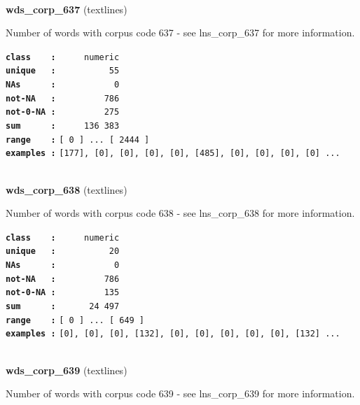 \documentclass[]{article}
\begin{document}
~

\textbf{wds\_corp\_637} (textlines)

Number of words with corpus code 637 - see lns\_corp\_637 for more
information.

\textbf{\texttt{class\ \ \ \ :}} \texttt{~~~~~numeric}\\
\textbf{\texttt{unique\ \ \ :}} \texttt{~~~~~~~~~~55}\\
\textbf{\texttt{NAs\ \ \ \ \ \ :}} \texttt{~~~~~~~~~~~0}\\
\textbf{\texttt{not-NA\ \ \ :}} \texttt{~~~~~~~~~786}\\
\textbf{\texttt{not-0-NA\ :}} \texttt{~~~~~~~~~275}\\
\textbf{\texttt{sum\ \ \ \ \ \ :}} \texttt{~~~~~136~383}\\
\textbf{\texttt{range\ \ \ \ :}}
\texttt{{[}\ 0\ {]}\ ...\ {[}\ 2444\ {]}}\\
\textbf{\texttt{examples\ :}}
\texttt{{[}177{]},\ {[}0{]},\ {[}0{]},\ {[}0{]},\ {[}0{]},\ {[}485{]},\ {[}0{]},\ {[}0{]},\ {[}0{]},\ {[}0{]}\ ...}\\

~

\textbf{wds\_corp\_638} (textlines)

Number of words with corpus code 638 - see lns\_corp\_638 for more
information.

\textbf{\texttt{class\ \ \ \ :}} \texttt{~~~~~numeric}\\
\textbf{\texttt{unique\ \ \ :}} \texttt{~~~~~~~~~~20}\\
\textbf{\texttt{NAs\ \ \ \ \ \ :}} \texttt{~~~~~~~~~~~0}\\
\textbf{\texttt{not-NA\ \ \ :}} \texttt{~~~~~~~~~786}\\
\textbf{\texttt{not-0-NA\ :}} \texttt{~~~~~~~~~135}\\
\textbf{\texttt{sum\ \ \ \ \ \ :}} \texttt{~~~~~~24~497}\\
\textbf{\texttt{range\ \ \ \ :}}
\texttt{{[}\ 0\ {]}\ ...\ {[}\ 649\ {]}}\\
\textbf{\texttt{examples\ :}}
\texttt{{[}0{]},\ {[}0{]},\ {[}0{]},\ {[}132{]},\ {[}0{]},\ {[}0{]},\ {[}0{]},\ {[}0{]},\ {[}0{]},\ {[}132{]}\ ...}\\

~

\textbf{wds\_corp\_639} (textlines)

Number of words with corpus code 639 - see lns\_corp\_639 for more
information.
\end{document}
